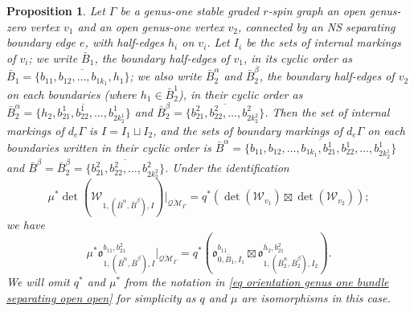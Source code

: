 \documentclass[11pt,a4paper]{article}
\newtheorem{prop}[dummy]{Proposition}
\theoremstyle{definition}
\theoremstyle{remark}
\newcommand{\oQMb}{{\overline{\mathcal{QM}}}}
\numberwithin{equation}{section}
\begin{document}
\begin{prop}\label{prop: orientation open open g=1 separating}
      Let $\Gamma$ be a genus-one stable graded $r$-spin graph an open genus-zero vertex $v_1$ and an open genus-one vertex $v_2$, connected by an NS separating boundary edge $e$, with half-edges $h_i$ on $v_i$. Let $I_i$ be the sets of internal markings of $v_i$; we write $\bar{B}_1$, the boundary half-edges of $v_1$, in its cyclic order as $\bar{B}_1=\overline{\{b_{11},b_{12},\dots,b_{1k_1},h_1\}}$; we also write $\bar{B}_{2}^\alpha$ and $\bar{B}_{2}^\beta$, the boundary half-edges of $v_2$ on each boundaries (where $h_1\in \bar{B}_{2}^1$), in their cyclic order as $\bar{B}_{2}^\alpha=\overline{\{h_2,b_{21}^1,b_{22}^1,\dots,b_{2k_2^1}^1\}}$ and $\bar{B}_{2}^\beta=\overline{\{b_{21}^2,b_{22}^2,\dots,b_{2k_2^2}^2\}}$. Then the set of internal markings of $d_e \Gamma$ is $I=I_1\sqcup I_2$, and the sets of boundary markings of $d_e \Gamma$ on each boundaries written in their cyclic order is $\bar{B}^\alpha=\overline{\{b_{11},b_{12},\dots,b_{1k_1},b_{21}^1,b_{22}^1,\dots,b_{2k_2^1}^1\}}$ and $\bar{B}^\beta=\bar{B}_{2}^\beta=\overline{\{b_{21}^2,b_{22}^2,\dots,b_{2k_2^2}^2\}}$. Under the identification 
      \begin{equation}\label{eq g=1 separating NS boundary node det decomp}
         \mu^* \det(\mathcal W_{1,(\bar{B}^\alpha,\bar{B}^\beta),I})\big|_{\oQMb_\Gamma} = q^*\left(\det(\mathcal W_{v_1})\boxtimes \det(\mathcal W_{v_2})\right);
      \end{equation}
       we have
        \begin{equation}\label{eq orientation genus one bundle separating open open}
        \mu^*  {\mathfrak{o}}^{b_{11},b_{21}^2}_{1,(\bar{B}^\alpha,\bar{B}^\beta),I}\big |_{\oQMb_\Gamma^{}}=
        q^*\left( {\mathfrak{o}}^{b_{11}}_{0,\bar B_1,I_1}\boxtimes{\mathfrak{o}}^{h_2, b_{21}^2}_{1,(\bar{B}_2^\alpha,\bar{B}_2^\beta),I_2}\right).
         \end{equation}
         We will omit $q^*$ and $\mu^*$ from the notation in \eqref{eq orientation genus one bundle separating open open} for simplicity as $q$ and $\mu$ are isomorphisms in this case.
\end{prop}
\end{document}
